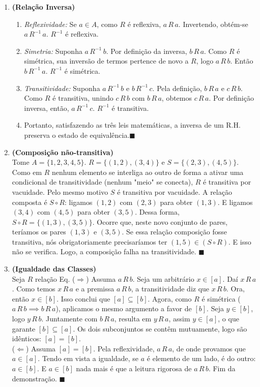 \documentclass[12pt]{article}
\begin{document}
\begin{enumerate}
\vspace{0.3cm}
\item \textbf{(Relação Inversa)}\\
\begin{enumerate}[label=\alph*)]
    \item \textit{Reflexividade:} Se $a \in A$, como $R$ é reflexiva, $a\,R\,a$. Invertendo, obtém-se $a\,R^{-1}\,a$. $R^{-1}$ é reflexiva.
    \item \textit{Simetria:} Suponha $a\,R^{-1}\,b$. Por definição da inversa, $b\,R\,a$. Como $R$ é simétrica, sua inversão de termos pertence de novo a $R$, logo $a\,R\,b$. Então $b\,R^{-1}\,a$. $R^{-1}$ é simétrica.
    \item \textit{Transitividade:} Suponha $a\,R^{-1}\,b$ e $b\,R^{-1}\,c$. Pela definição, $b\,R\,a$ e $c\,R\,b$. Como $R$ é transitiva, unindo $c\,R\,b$ com $b\,R\,a$, obtemos $c\,R\,a$. Por definição inversa, então, $a\,R^{-1}\,c$. $R^{-1}$ é transitiva.
    \item Portanto, satisfazendo as três leis matemáticas, a inversa de um R.H. preserva o estado de equivalência.$\blacksquare$
\end{enumerate}

\vspace{0.3cm}
\item \textbf{(Composição não-transitiva)}\\
Tome $A = \{1,2,3,4,5\}$. 
$R = \{(1,2), (3,4)\}$ e $S = \{(2,3), (4,5)\}$.
Como em $R$ nenhum elemento se interliga ao outro de forma a ativar uma condicional de transitividade (nenhum "meio" se conecta), $R$ é transitiva por vacuidade. Pelo mesmo motivo $S$ é transitiva por vacuidade.
A relação composta é $S \circ R$: ligamos $(1,2)$ com $(2,3)$ para obter $(1,3)$. E ligamos $(3,4)$ com $(4,5)$ para obter $(3,5)$. Dessa forma, $S \circ R = \{ (1,3), (3,5) \}$.
Ocorre que, neste novo conjunto de pares, teríamos os pares $(1,3)$ e $(3,5)$. Se essa relação composição fosse transitiva, nós obrigatoriamente precisaríamos ter $(1,5) \in (S \circ R)$. E isso não se verifica. Logo, a composição falha na transitividade. $\blacksquare$

\vspace{0.3cm}
\item \textbf{(Igualdade das Classes)}\\
Seja $R$ relação  Eq.
($\Rightarrow$) Assuma $a\,R\,b$. Seja um arbitrário $x \in [a]$. Daí $x\,R\,a$. Como temos $x\,R\,a$ e a premissa $a\,R\,b$, a transitividade diz que $x\,R\,b$. Ora, então $x \in [b]$. Isso conclui que $[a] \subseteq [b]$. Agora, como $R$ é simétrica ($a\,R\,b \implies b\,R\,a$), aplicamos o mesmo argumento a favor de $[b]$. Seja $y \in [b]$, logo $y\,R\,b$. Juntamente com $b\,R\,a$, resulta em $y\,R\,a$, assim $y \in [a]$, o que garante $[b] \subseteq [a]$. Os dois subconjuntos se contêm mutuamente, logo são idênticos: $[a]=[b]$.\\
($\Leftarrow$) Assuma $[a]=[b]$. Pela reflexividade, $a\,R\,a$, de onde provamos que $a \in [a]$. Tendo em vista a igualdade, se $a$ é elemento de um lado, é do outro: $a \in [b]$. E $a \in [b]$ nada mais é que a leitura rigorosa de $a\,R\,b$. Fim da demonstração. $\blacksquare$


\end{enumerate}
\end{document}
